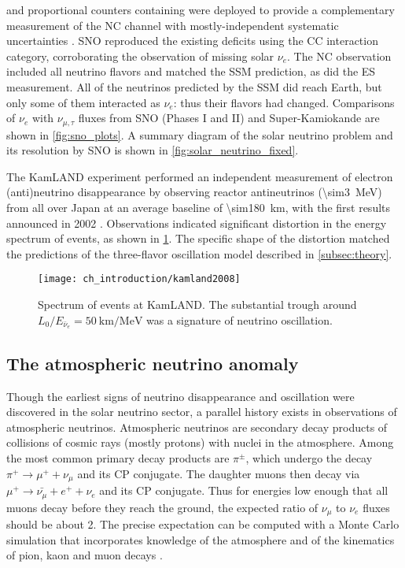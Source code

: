 and proportional counters containing 
were deployed to provide a complementary measurement of the NC channel
with mostly-independent systematic uncertainties \cite{sno_ncd_instrumentation}.
SNO reproduced the existing deficits using the CC interaction category,
corroborating the observation of missing solar $\nu_e$.
The NC observation included all neutrino flavors and matched the SSM prediction,
as did the ES measurement.
All of the neutrinos predicted by the SSM did reach Earth,
but only some of them interacted as $\nu_e$: thus their flavors had changed.
Comparisons of $\nu_e$ with $\nu_{\mu,\tau}$ fluxes
from SNO (Phases I and II) and Super-Kamiokande are shown in \cref{fig:sno_plots}.
A summary diagram of the solar neutrino problem and its resolution by SNO
is shown in \cref{fig:solar_neutrino_fixed}.

The KamLAND experiment performed
an independent measurement of electron (anti)\-neutrino disappearance
by observing reactor antineutrinos (\SI{\sim3}{\MeV}) from all over Japan
at an average baseline of \SI{\sim180}{\km},
with the first results announced in 2002 \cite{kamland_first}.
Observations indicated significant distortion
in the energy spectrum of \nuebar{} events,
as shown in \cref{fig:kamland_spec}.
The specific shape of the distortion
matched the predictions of the three-flavor oscillation model
described in \cref{subsec:theory}.

\begin{figure}
    \centering
    \texttt{[image: ch\_introduction/kamland2008]}
    \caption[KamLAND oscillation spectrum]{
        Spectrum of \nuebar{} events at KamLAND.
        The substantial trough around $L_0/E_{\bar{\nu}_e} = \SI{50}{\km\per\MeV}$
        was a signature of neutrino oscillation.
    }
    \label{fig:kamland_spec}
\end{figure}

\subsection{The atmospheric neutrino anomaly}
\label{subsec:atmospheric_anomaly}

Though the earliest signs of neutrino disappearance and oscillation
were discovered in the solar neutrino sector,
a parallel history exists in observations of atmospheric neutrinos.
Atmospheric neutrinos are secondary decay products of
collisions of cosmic rays (mostly protons) with nuclei in the atmosphere.
Among the most common primary decay products are $\pi^{\pm}$,
which undergo the decay $\pi^+ \to \mu^+ + \nu_\mu$ and its CP conjugate.
The daughter muons then decay via $\mu^+ \to \bar{\nu_\mu} + e^+ + \nu_e$
and its CP conjugate.
Thus for energies low enough that all muons decay before they reach the ground,
the expected ratio of $\nu_\mu$ to $\nu_e$ fluxes should be about 2.
The precise expectation can be computed with a Monte Carlo simulation
that incorporates knowledge of the atmosphere and of the kinematics of
pion, kaon and muon decays \cite{neutrino_textbook}.

